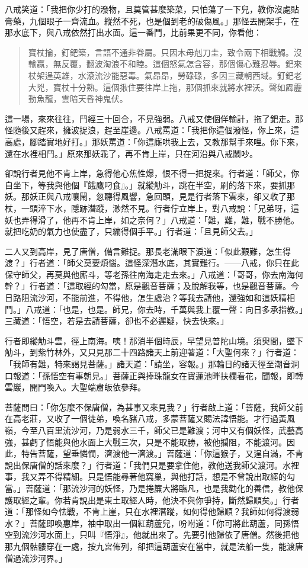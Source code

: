 八戒笑道：「我把你少打的潑物，且莫管甚麼築菜，只怕蕩了一下兒，教你沒處貼膏藥，九個眼子一齊流血。縱然不死，也是個到老的破傷風。」那怪丟開架手，在那水底下，與八戒依然打出水面。這一番鬥，比前果更不同，你看他：
\begin{quote}
寶杖掄，釘鈀築，言語不通非眷屬。只因木母剋刀圭，致令兩下相戰觸。沒輸贏，無反覆，翻波淘浪不和睦。這個怒氣怎含容，那個傷心難忍辱。鈀來杖架逞英雄，水滾流沙能惡毒。氣昂昂，勞碌碌，多因三藏朝西域。釘鈀老大兇，寶杖十分熟。這個揪住要往岸上拖，那個抓來就將水裡沃。聲如霹靂動魚龍，雲暗天昏神鬼伏。
\end{quote}

這一場，來來往往，鬥經三十回合，不見強弱。八戒又使個佯輸計，拖了鈀走。那怪隨後又趕來，擁波捉浪，趕至崖邊。八戒罵道：「我把你這個潑怪，你上來，這高處，腳踏實地好打。」那妖罵道：「你這廝哄我上去，又教那幫手來哩。你下來，還在水裡相鬥。」原來那妖乖了，再不肯上岸，只在河沿與八戒鬧吵。

卻說行者見他不肯上岸，急得他心焦性爆，恨不得一把捉來。行者道：「師父，你自坐下，等我與他個『餓鷹叼食』。」就縱觔斗，跳在半空，刷的落下來，要抓那妖。那妖正與八戒嚷鬧，忽聽得風響，急回頭，見是行者落下雲來，卻又收了那杖，一頭淬下水，隱跡潛蹤，渺然不見。行者佇立岸上，對八戒說：「兄弟呀，這妖也弄得滑了，他再不肯上岸，如之奈何？」八戒道：「難，難，難，戰不勝他。就把吃奶的氣力也使盡了，只繃得個手平。」行者道：「且見師父去。」

二人又到高岸，見了唐僧，備言難捉。那長老滿眼下淚道：「似此艱難，怎生得渡？」行者道：「師父莫要煩惱。這怪深潛水底，其實難行。——八戒，你只在此保守師父，再莫與他廝斗，等老孫往南海走走去來。」八戒道：「哥哥，你去南海何幹？」行者道：「這取經的勾當，原是觀音菩薩；及脫解我等，也是觀音菩薩。今日路阻流沙河，不能前進，不得他，怎生處治？等我去請他，還強如和這妖精相鬥。」八戒道：「也是，也是。師兄，你去時，千萬與我上覆一聲：向日多承指教。」三藏道：「悟空，若是去請菩薩，卻也不必遲疑，快去快來。」

行者即縱觔斗雲，徑上南海。咦！那消半個時辰，早望見普陀山境。須臾間，墜下觔斗，到紫竹林外，又只見那二十四路諸天上前迎著道：「大聖何來？」行者道：「我師有難，特來謁見菩薩。」諸天道：「請坐，容報。」那輪日的諸天徑至潮音洞口報道：「孫悟空有事朝見。」菩薩正與捧珠龍女在寶蓮池畔扶欄看花，聞報，即轉雲巖，開門喚入。大聖端肅皈依參拜。

菩薩問曰：「你怎麼不保唐僧，為甚事又來見我？」行者啟上道：「菩薩，我師父前在高老莊，又收了一個徒弟，喚名豬八戒，多蒙菩薩又賜法諱悟能。才行過黃風嶺，今至八百里流沙河，乃是弱水三千，師父已是難渡；河中又有個妖怪，武藝高強，甚虧了悟能與他水面上大戰三次，只是不能取勝，被他攔阻，不能渡河。因此，特告菩薩，望垂憐憫，濟渡他一濟渡。」菩薩道：「你這猴子，又逞自滿，不肯說出保唐僧的話來麼？」行者道：「我們只是要拿住他，教他送我師父渡河。水裡事，我又弄不得精細。只是悟能尋著他窩巢，與他打話，想是不曾說出取經的勾當。」菩薩道：「那流沙河的妖怪，乃是捲簾大將臨凡，也是我勸化的善信，教他保護取經之輩。你若肯說出是東土取經人時，他決不與你爭持，斷然歸順矣。」行者道：「那怪如今怯戰，不肯上崖，只在水裡潛蹤，如何得他歸順？我師如何得渡弱水？」菩薩即喚惠岸，袖中取出一個紅葫蘆兒，吩咐道：「你可將此葫蘆，同孫悟空到流沙河水面上，只叫『悟淨』，他就出來了。先要引他歸依了唐僧。然後把他那九個骷髏穿在一處，按九宮佈列，卻把這葫蘆安在當中，就是法船一隻，能渡唐僧過流沙河界。」

